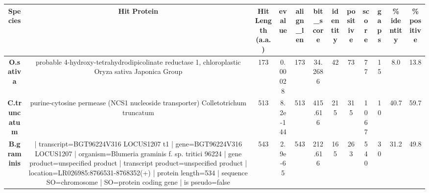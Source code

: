 \begin{tabular}{|c|c|c|c|c|c|c|c|c|c|c|c|} \hline
\textbf{Species} & \textbf{Hit Protein} & \textbf{Hit Length (a.a.)} & \textbf{evalue} & \textbf{align\_len} & \textbf{bit\_score} & \textbf{identity} & \textbf{positive} & \textbf{score} & \textbf{gaps} & \textbf{\% identity} & \textbf{\% positive} \\ \hline
\textbf{O.sativa} & probable 4-hydroxy-tetrahydrodipicolinate reductase 1, chloroplastic Oryza sativa Japonica Group & 173 & 0.00028 & 173 & 34.2686 & 42 & 73 & 77 & 15 & 8.0 & 13.8\\
\textbf{C.truncatum} & purine-cytosine permease (NCS1 nucleoside transporter) Colletotrichum truncatum & 513 & 8.2e-144 & 513 & 415.616 & 215 & 315 & 1067 & 10 & 40.7 & 59.7\\
\textbf{B.graminis} & | transcript=BGT96224V316 LOCUS1207 t1 | gene=BGT96224V316 LOCUS1207 | organism=Blumeria graminis f. sp. tritici 96224 | gene product=unspecified product | transcript product=unspecified product | location=LR026985:8766531-8768352(+) | protein length=534 | sequence SO=chromosome | SO=protein coding gene | is pseudo=false & 543 & 2.9e-65 & 543 & 212.616 & 165 & 263 & 540 & 30 & 31.2 & 49.8\\
\hline \end{tabular}
